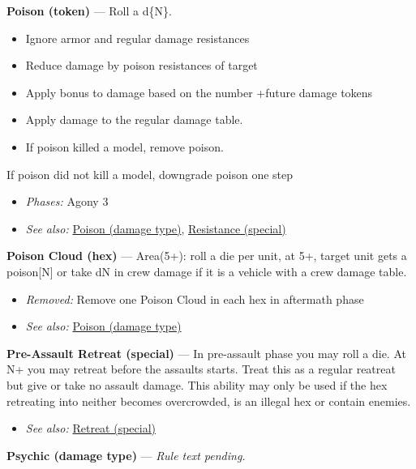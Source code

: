 \documentclass[a4paper,12pt]{article}
\begin{document}
\label{rule-token-poison}%
\noindent\textbf{Poison (token)} --- Roll a d\{N\}.
\begin{itemize}
\item Ignore armor and regular damage resistances
\item Reduce damage by poison resistances of target
\item Apply bonus to damage based on the number +future damage tokens
\item Apply damage to the regular damage table.
\item If poison killed a model, remove poison.
\end{itemize}

If poison did not kill a model, downgrade poison one step
\begin{itemize}
\item \textit{Phases:} Agony 3
\item \textit{See also:} \hyperref[rule-damage-type-poison]{Poison (damage type)}, \hyperref[rule-special-resistance]{Resistance (special)}
\end{itemize}


\label{rule-hex-poison-cloud}%
\noindent\textbf{Poison Cloud (hex)} --- Area(5+): roll a die per unit, at 5+, target unit gets a poison[N] or take dN in crew damage if it is a vehicle with a crew damage table.
\begin{itemize}
\item \textit{Removed:} Remove one Poison Cloud in each hex in aftermath phase
\item \textit{See also:} \hyperref[rule-damage-type-poison]{Poison (damage type)}
\end{itemize}


\label{rule-special-pre-assault-retreat}%
\noindent\textbf{Pre-Assault Retreat (special)} --- In pre-assault phase you may roll a die. At N+ you may retreat before the assaults starts. Treat this as a regular reatreat but give or take no assault damage. This ability may only be used if the hex retreating into neither becomes overcrowded, is an illegal hex or contain enemies.
\begin{itemize}
\item \textit{See also:} \hyperref[rule-special-retreat]{Retreat (special)}
\end{itemize}


\label{rule-damage-type-psychic}%
\noindent\textbf{Psychic (damage type)} --- \textit{Rule text pending.}
\end{document}
